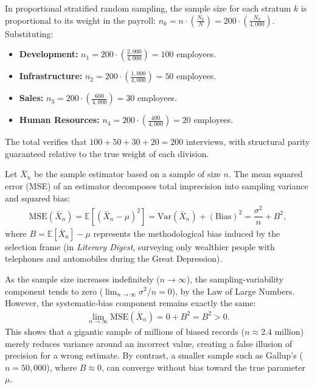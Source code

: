 \begin{solproblema}[prob:4bc23ad]
	In proportional stratified random sampling, the sample size for each stratum $k$ is proportional to its weight in the payroll: $n_k = n \cdot \left(\frac{N_k}{N}\right) = 200 \cdot \left(\frac{N_k}{4,000}\right)$. Substituting:
	\begin{itemize}
		\item \textbf{Development:} $n_1 = 200 \cdot \left(\frac{2,000}{4,000}\right) = 100$ employees.
		\item \textbf{Infrastructure:} $n_2 = 200 \cdot \left(\frac{1,000}{4,000}\right) = 50$ employees.
		\item \textbf{Sales:} $n_3 = 200 \cdot \left(\frac{600}{4,000}\right) = 30$ employees.
		\item \textbf{Human Resources:} $n_4 = 200 \cdot \left(\frac{400}{4,000}\right) = 20$ employees.
	\end{itemize}
	The total verifies that $100 + 50 + 30 + 20 = 200$ interviews, with structural parity guaranteed relative to the true weight of each division.
\end{solproblema}

\begin{solproblema}
	Let $\bar{X}_n$ be the sample estimator based on a sample of size $n$. The mean squared error (MSE) of an estimator decomposes total imprecision into sampling variance and squared bias:
	\begin{align}
		\text{MSE}(\bar{X}_n) = \mathbb{E}\left[(\bar{X}_n - \mu)^2\right] = \text{Var}(\bar{X}_n) + (\text{Bias})^2 = \dfrac{\sigma^2}{n} + B^2,
	\end{align}
	where $B = \mathbb{E}[\bar{X}_n] - \mu$ represents the methodological bias induced by the selection frame (in \emph{Literary Digest}, surveying only wealthier people with telephones and automobiles during the Great Depression).

	As the sample size increases indefinitely ($n \to \infty$), the sampling-variability component tends to zero ($\lim_{n \to \infty} \sigma^2/n = 0$), by the Law of Large Numbers. However, the systematic-bias component remains exactly the same:
	\begin{align}
		\lim_{n \to \infty} \text{MSE}(\bar{X}_n) = 0 + B^2 = B^2 > 0.
	\end{align}
	This shows that a gigantic sample of millions of biased records ($n \approx 2.4$ million) merely reduces variance around an incorrect value, creating a false illusion of precision for a wrong estimate. By contrast, a smaller sample such as Gallup's ($n = 50,000$), where $B \approx 0$, can converge without bias toward the true parameter $\mu$.
\end{solproblema}

